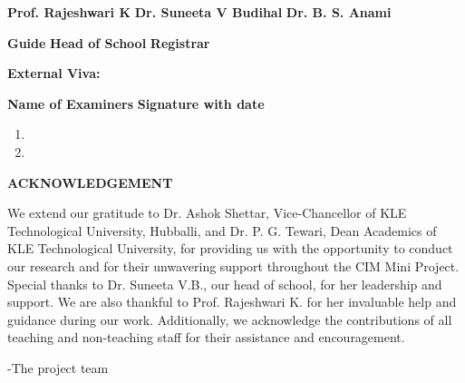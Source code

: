 \documentclass[12 pt]{report}
\begin{document}
\vspace{2cm}
\begin{small} \textbf{Prof. Rajeshwari K} \hspace{1.5cm} \textbf{Dr. Suneeta V Budihal} \hspace{1.5cm} \textbf{Dr. B. S. Anami} \linebreak
\end{small}
\vspace{1cm}
\hspace{1.8cm} \small{\textbf{Guide} \hspace{3.8cm} \textbf{Head of School} \hspace{3.2cm}  \textbf{Registrar}}


\vspace{0.8cm}

\begin{flushleft}
  \textbf{External Viva: \\}
\end{flushleft}
\textbf{Name of Examiners} \hspace{8cm} \textbf{Signature with date}
\begin{enumerate}
  \item
  \item
\end{enumerate}

\newpage
\begin{center}
  \begin{Large}
    \textbf{ACKNOWLEDGEMENT}
  \end{Large}
\end{center}
We extend our gratitude to Dr. Ashok Shettar, Vice-Chancellor of KLE Technological University, Hubballi, and Dr. P. G. Tewari, Dean Academics of KLE Technological University, for providing us with the opportunity to conduct our research and for their unwavering support throughout the CIM Mini Project. Special thanks to Dr. Suneeta V.B., our head of school, for her leadership and support. We are also thankful to Prof. Rajeshwari K. for her invaluable help and guidance during our work. Additionally, we acknowledge the contributions of all teaching and non-teaching staff for their assistance and encouragement.

\flushright
-The project team
\flushleft
\end{document}
